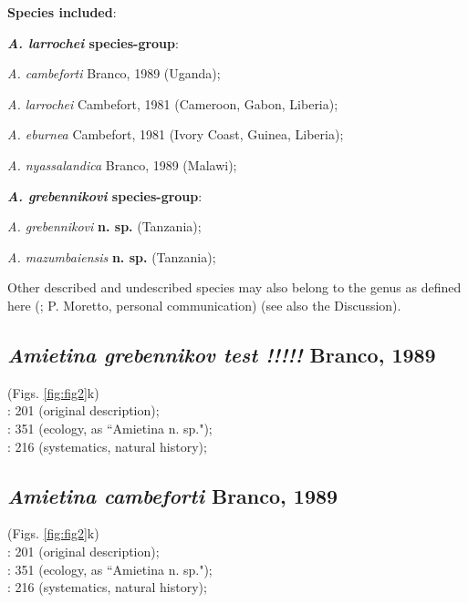 \documentclass[fleqn,10pt,lineno]{wlpeerj}
\begin{document}
\textbf{Species included}:

\smallskip \noindent \textbf{\textit{A. larrochei} species-group}:

\indent \textit{A. cambeforti} Branco, 1989 (Uganda);

\indent \textit{A. larrochei} Cambefort, 1981 (Cameroon, Gabon, Liberia);

\indent \textit{A. eburnea} Cambefort, 1981 (Ivory Coast, Guinea, Liberia);

\indent \textit{A. nyassalandica} Branco, 1989 (Malawi);

\smallskip \noindent \textbf{\textit{A. grebennikovi} species-group}:

\indent \textit{A. grebennikovi} \textbf{n. sp.} (Tanzania);

\indent \textit{A. mazumbaiensis} \textbf{n. sp.} (Tanzania);

\smallskip

Other described and undescribed species may also belong to the genus as defined here (\citealp{moretto2010onthophagus}; P. Moretto, personal communication) (see also the Discussion).


\subsection*{\textbf{\textit{Amietina grebennikov test !!!!!} Branco, 1989}}
(Figs. \ref{fig:fig2}k)\\
\cite{branco1988deux}: 201 (original description);\\
\cite{nummelin1989dung}: 351 (ecology, as ``{Amietina} n. sp.");\\
\cite{davis2008african}: 216 (systematics, natural history);\\








\subsection*{\textbf{\textit{Amietina cambeforti} Branco, 1989}}
(Figs. \ref{fig:fig2}k)\\
\cite{branco1988deux}: 201 (original description);\\
\cite{nummelin1989dung}: 351 (ecology, as ``{Amietina} n. sp.");\\
\cite{davis2008african}: 216 (systematics, natural history);\\
\end{document}
